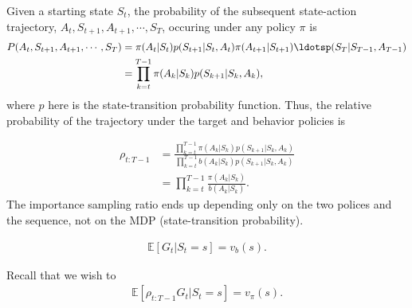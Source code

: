 Given a starting state $S_t$, the probability of the subsequent state-action trajectory, $A_t, S_{t+1}, A_{t+1},\cdots,S_T$, occuring under any policy $\pi$ is 
\begin{align*}
	P(A_t, S_{t+1}, A_{t+1},\cdots,S_T)&= \pi(A_t|S_t)p(S_{t+1}|S_t,A_t)\pi(A_{t+1}|S_{t+1})\ldotsp(S_T|S_{T-1},A_{T-1})\\ 
	&= \prod_{k=t}^{T-1}\pi(A_k|S_k)p(S_{k+1}|S_k,A_k),
\end{align*}
where $p$ here is the state-transition probability function. Thus, the relative probability of the trajectory under the target and behavior policies is 

\begin{align*}
	\rho_{t:T-1} &=  \frac{\prod_{k=t}^{T-1}\pi(A_k|S_k)p(S_{k+1}|S_k,A_k)}{ \prod_{k=t}^{T-1}b(A_k|S_k)p(S_{k+1}|S_k,A_k)}\\
	&= \prod_{k=t}^{T-1}\frac{\pi(A_k|S_k)}{b(A_k|S_k)}.
	\label{eq:importance_sampling_ratio}
\end{align*}
The importance sampling ratio ends up depending only on the two polices and the sequence, not on the MDP (state-transition probability).

\begin{align*}
	\mathbb{E}[G_t|S_t=s] = v_b(s).
\end{align*}

Recall that we wish to 
\begin{align*}
	\mathbb{E}[\rho_{t:T-1} G_t|S_t=s] = v_\pi(s).
\end{align*}

%


